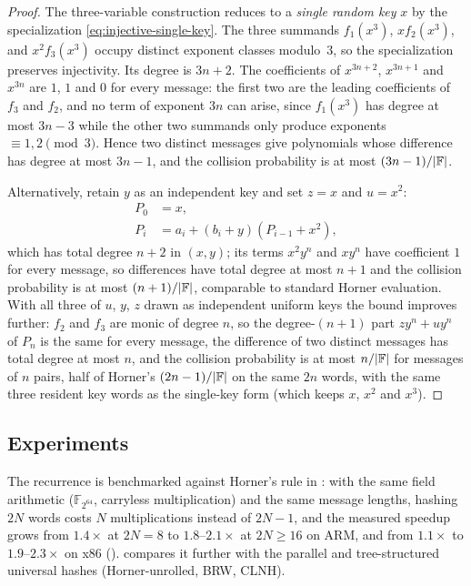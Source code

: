\begin{proof}
   \vspace{.5em}

   The three-variable construction reduces to a \emph{single random key} $x$
   by the specialization \eqref{eq:injective-single-key}.
   The three summands $f_1(x^3)$, $x f_2(x^3)$, and $x^2 f_3(x^3)$ occupy
   distinct exponent classes modulo~$3$, so the specialization preserves injectivity.
   Its degree is $3n+2$.  The coefficients of $x^{3n+2}$, $x^{3n+1}$ and $x^{3n}$ are $1$, $1$ and $0$ for every message: the first two are the leading coefficients of $f_3$ and $f_2$, and no term of exponent $3n$ can arise, since $f_1(x^3)$ has degree at most $3n-3$ while the other two summands only produce exponents $\equiv1,2\pmod 3$.
   Hence two distinct messages give polynomials whose difference has degree at most $3n-1$, and the collision probability is at most $(3n-1)/|\mathbb{F}|$.

   Alternatively, retain $y$ as an independent key and set $z=x$ and $u=x^2$:
   \begin{align}
      P_0 &= x, \\
      P_{i} &= a_{i} + (b_{i}+y)(P_{i-1}+x^2),
   \end{align}
   which has total degree $n+2$ in $(x,y)$; its terms $x^2y^n$ and $xy^n$ have coefficient $1$ for every message, so differences have total degree at most $n+1$ and the collision probability is at most $(n+1)/|\mathbb{F}|$, comparable
   to standard Horner evaluation.
   With all three of $u$, $y$, $z$ drawn as independent uniform keys the bound
   improves further: $f_2$ and $f_3$ are monic of degree $n$, so the
   degree-$(n+1)$ part $zy^n+uy^n$ of $P_n$ is the same for every message, the
   difference of two distinct messages has total degree at most $n$, and the
   collision probability is at most $n/|\mathbb{F}|$ for messages of $n$ pairs, half of
   Horner's $(2n-1)/|\mathbb{F}|$ on the same $2n$ words, with the same three resident
   key words as the single-key form (which keeps $x$, $x^2$ and $x^3$).
\end{proof}

\subsection{Experiments}
\label{sec:injective:experiments}

The recurrence is benchmarked against Horner's rule in
: with the same field arithmetic
($\mathbb F_{2^{64}}$, carryless multiplication) and the same message lengths,
hashing $2N$ words costs $N$ multiplications instead of $2N-1$, and the measured
speedup grows from $1.4\times$ at $2N=8$ to $1.8$--$2.1\times$ at $2N\ge16$ on ARM,
and from $1.1\times$ to $1.9$--$2.3\times$ on x86 ().
 compares it further with the parallel and
tree-structured universal hashes (Horner-unrolled, BRW, CLNH).

